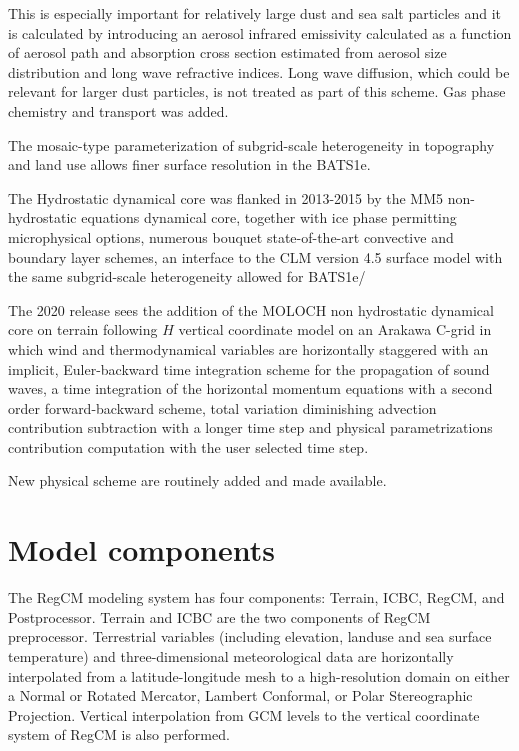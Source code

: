 This is especially important for relatively large dust and sea salt particles
and it is calculated by introducing an aerosol infrared emissivity calculated
as a function of aerosol path and absorption cross section estimated from
aerosol size distribution and long wave refractive indices. Long wave diffusion,
which could be relevant for larger dust particles, is not treated as part of
this scheme. Gas phase chemistry and transport was added.

The mosaic-type parameterization of subgrid-scale heterogeneity in
topography and land use \citep{Giorgi_03} allows finer surface resolution
in the \ac{BATS1e}.

The Hydrostatic dynamical core was flanked in 2013-2015 by the \ac{MM5}
non-hydrostatic equations dynamical core, together with ice phase permitting
microphysical options, numerous bouquet state-of-the-art convective and
boundary layer schemes, an interface to the \ac{CLM} version 4.5 surface model
with the same subgrid-scale heterogeneity allowed for \ac{BATS1e}/

The 2020 release sees the addition of the \ac{MOLOCH} non hydrostatic
dynamical core on terrain following $H$ vertical coordinate model on an
Arakawa C-grid in which wind and thermodynamical variables are horizontally
staggered with an implicit, Euler-backward time integration scheme for the
propagation of sound waves, a time integration of the horizontal momentum
equations with a second order forward-backward scheme, total variation
diminishing advection contribution subtraction with a longer time step and
physical parametrizations contribution computation with the user selected
time step.

New physical scheme are routinely added and made available.

\section{Model components}

The \ac{RegCM} modeling system has four components: Terrain, ICBC, \ac{RegCM},
and Postprocessor.  Terrain and ICBC are the two components of \ac{RegCM}
preprocessor. Terrestrial variables (including elevation, landuse and sea
surface temperature) and three-dimensional meteorological data are
horizontally interpolated from a latitude-longitude mesh to a high-resolution
domain on either a Normal or Rotated Mercator, Lambert Conformal, or Polar
Stereographic Projection. Vertical interpolation from \ac{GCM} levels to the
vertical coordinate system of \ac{RegCM} is also performed.

